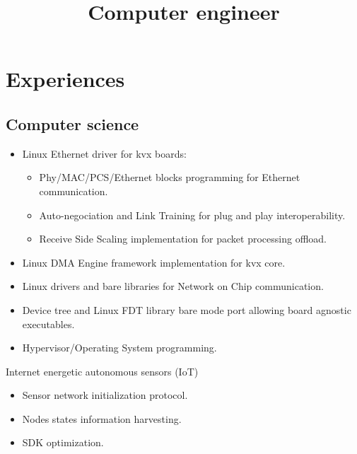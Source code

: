 \documentclass[11pt,a4paper,sans]{moderncv}        %
\title{Computer engineer}                               %
\begin{document}
\vspace*{-1cm}
\makecvtitle

\vspace*{-1.5cm}
\setlength{\hintscolumnwidth}{0.15\textwidth} %

\section{Experiences}
\subsection{Computer science}
	{
	\begin{itemize}
		\item Linux Ethernet driver for kvx boards:
		\begin{itemize}
			\item Phy/MAC/PCS/Ethernet blocks programming for
				Ethernet communication.
			\item Auto-negociation and Link Training for plug and
				play interoperability.
			\item Receive Side Scaling implementation for packet
				processing offload.
		\end{itemize}
		\item Linux DMA Engine framework implementation for kvx core.
		\item Linux drivers and bare libraries for Network on Chip
			communication.
		\item Device tree and Linux FDT library bare mode port allowing
			board agnostic executables.
		\item Hypervisor/Operating System programming.
	\end{itemize}
	}
	{Internet energetic autonomous sensors (IoT)
	\begin{itemize}
		\item Sensor network initialization protocol.
		\item Nodes states information harvesting.
		\item SDK optimization.
	\end{itemize}
	}
\end{document}
